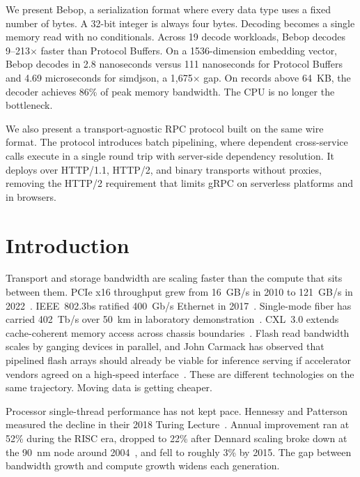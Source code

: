 \documentclass[10pt,onecolumn]{article}
\begin{document}
We present Bebop, a serialization format where every data type uses a fixed number of bytes. A 32-bit integer is always four bytes. Decoding becomes a single memory read with no conditionals. Across 19 decode workloads, Bebop decodes 9--213$\times$ faster than Protocol Buffers. On a 1536-dimension embedding vector, Bebop decodes in 2.8 nanoseconds versus 111 nanoseconds for Protocol Buffers and 4.69 microseconds for simdjson, a 1,675$\times$ gap. On records above 64~KB, the decoder achieves 86\% of peak memory bandwidth. The CPU is no longer the bottleneck.

We also present a transport-agnostic RPC protocol built on the same wire format. The protocol introduces batch pipelining, where dependent cross-service calls execute in a single round trip with server-side dependency resolution. It deploys over HTTP/1.1, HTTP/2, and binary transports without proxies, removing the HTTP/2 requirement that limits gRPC on serverless platforms and in browsers.

\newpage

\section{Introduction}

Transport and storage bandwidth are scaling faster than the compute that sits between them. PCIe x16 throughput grew from 16~GB/s in 2010 to 121~GB/s in 2022~\cite{pcisig-pcie6}. IEEE~802.3bs ratified 400~Gb/s Ethernet in 2017~\cite{ieee-802.3bs}. Single-mode fiber has carried 402~Tb/s over 50~km in laboratory demonstration~\cite{puttnam-402tbps}. CXL~3.0 extends cache-coherent memory access across chassis boundaries~\cite{sharma-cxl-survey}. Flash read bandwidth scales by ganging devices in parallel, and John Carmack has observed that pipelined flash arrays should already be viable for inference serving if accelerator vendors agreed on a high-speed interface~\cite{carmack-fiber-flash}. These are different technologies on the same trajectory. Moving data is getting cheaper.

Processor single-thread performance has not kept pace. Hennessy and Patterson measured the decline in their 2018 Turing Lecture~\cite{hennessy-golden-age}. Annual improvement ran at 52\% during the RISC era, dropped to 22\% after Dennard scaling broke down at the 90~nm node around 2004~\cite{bohr-dennard-retrospective}, and fell to roughly 3\% by 2015. The gap between bandwidth growth and compute growth widens each generation.
\end{document}
